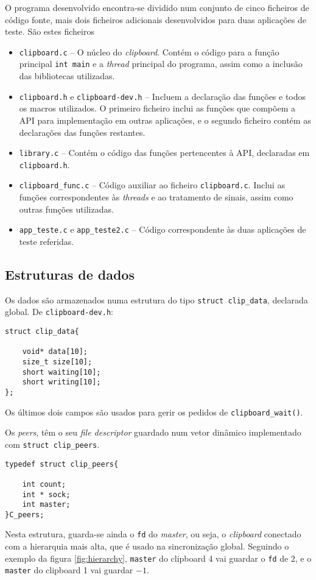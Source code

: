 \documentclass{article}
\begin{document}
O programa desenvolvido encontra-se dividido num conjunto de cinco ficheiros
de código fonte, mais dois ficheiros adicionais desenvolvidos para duas
aplicações de teste. São estes ficheiros
\begin{itemize} \setlength{\itemsep}{0pt}
    \item \texttt{clipboard.c} -- O núcleo do \textit{clipboard}.
        Contém o código para a função principal \texttt{int main} e
        a \textit{thread} principal do programa, assim como a inclusão das
        bibliotecas utilizadas. \\
    \item \texttt{clipboard.h} e \texttt{clipboard-dev.h} -- Incluem a 
        declaração das funções e todos os macros utilizados.
        O primeiro ficheiro inclui as funções que compõem a API para
        implementação em outras aplicações, e o segundo ficheiro contém as
        declarações das funções restantes. \\
    \item \texttt{library.c} -- Contém o código das funções pertencentes à
        API, declaradas em \texttt{clipboard.h}.
    \item \texttt{clipboard\_func.c} -- Código auxiliar ao ficheiro
        \texttt{clipboard.c}. Inclui as funções correspondentes às
        \textit{threads} e ao tratamento de sinais, assim como outras funções
        utilizadas.
    \item \texttt{app\_teste.c} e \texttt{app\_teste2.c} -- Código
        correspondente às duas aplicações de teste referidas.
\end{itemize}

\subsection{Estruturas de dados}
\label{sec:estruturas}

Os dados são armazenados numa estrutura do tipo \texttt{struct clip_data}, declarada global. De \texttt{clipboard-dev.h}:
\begin{verbatim}
struct clip_data{
	
	void* data[10];
	size_t size[10];
	short waiting[10];
	short writing[10];
};
\end{verbatim}
Os últimos dois campos são usados para gerir os pedidos de \texttt{clipboard_wait()}.

Os \textit{peers}, têm o seu \textit{file descriptor} guardado num vetor dinâmico implementado com \texttt{struct clip_peers}.
\begin{verbatim}
typedef struct clip_peers{
	
	int count;
	int * sock;
	int master;
}C_peers;
\end{verbatim}
Nesta estrutura, guarda-se ainda o \texttt{fd} do \textit{master}, ou seja, o \textit{clipboard} conectado com a hierarquia mais alta, que é usado na sincronização global. 
Seguindo o exemplo da figura \ref{fig:hierarchy}, \texttt{master} do clipboard 4 vai guardar o \texttt{fd} de 2, e o \texttt{master} do clipboard 1 vai guardar $-1$.
\end{document}
